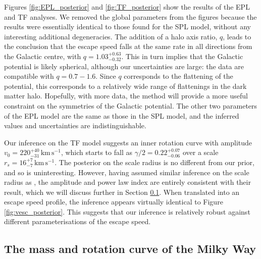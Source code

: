 \documentclass[useAMS,twocolumn,usenatbib]{mn2e}
\def\kms{{\,\mathrm{km\,s^{-1}}}}
\begin{document}
Figures \ref{fig:EPL_posterior} and \ref{fig:TF_posterior} show the results of the EPL and TF analyses. 
We removed the global parameters from the figures because the results were essentially identical to those found for the SPL model, without any interesting additional degeneracies. 
The addition of a halo axis ratio, $q$, leads to the conclusion that the escape speed falls at the same rate in all directions from the Galactic centre, with $q = 1.03^{+0.63}_{-0.32}$. 
This in turn implies that the Galactic potential is likely spherical, although our uncertainties are large: the data are compatible with $q=0.7 - 1.6$. 
Since $q$ corresponds to the flattening of the potential, this corresponds to a relatively wide range of flattenings in the dark matter halo. 
Hopefully, with more data, the method will provide a more useful constraint on the symmetries of the Galactic potential. 
The other two parameters of the EPL model are the same as those in the SPL model, and the inferred values and uncertainties are indistinguishable.

Our inference on the TF model suggests an inner rotation curve with amplitude $v_0 = 220^{+40}_{-31}\kms$, which starts to fall as $\gamma/2 = 0.22^{+0.07}_{-0.06}$ over a scale $r_s = 16^{+7}_{-7}\kms$. 
The posterior on the scale radius is no different from our prior, and so is uninteresting. 
However, having assumed similar inference on the scale radius as \citet{Gi14}, the amplitude and power law index are entirely consistent with their result, which we will discuss further in Section \ref{sec:mass}. 
When translated into an escape speed profile, the inference appears virtually identical to Figure \ref{fig:vesc_posterior}. 
This suggests that our inference is relatively robust against different parameterisations of the escape speed.

\subsection{The mass and rotation curve of the Milky Way}
\label{sec:mass}
\end{document}
